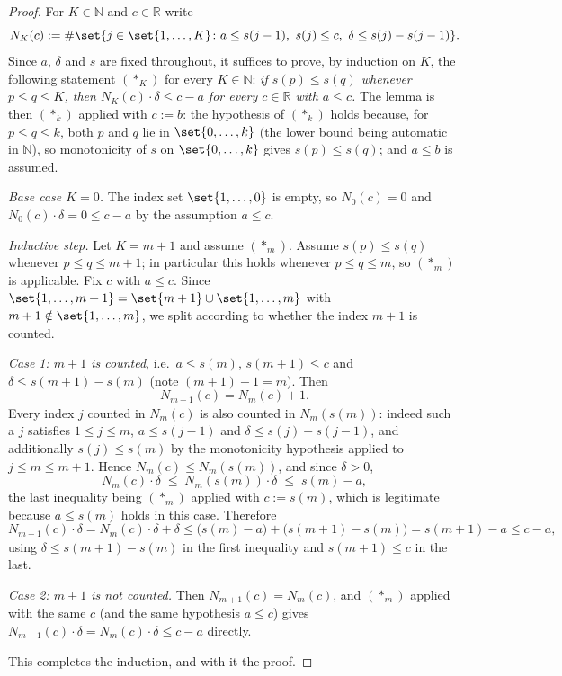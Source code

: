 \begin{proof}
  For $K \in \mathbb{N}$ and $c \in \mathbb{R}$ write
  \[
    N_K(c) := \#\set{ j \in \set{1,\dots,K} \colon a \le s(j-1),\ s(j) \le c,\
      \delta \le s(j)-s(j-1) }
    .
  \]
  Since $a$, $\delta$ and $s$ are fixed throughout, it suffices to prove, by induction on $K$, the
  following statement $(\ast_K)$ for every $K \in \mathbb{N}$: \emph{if $s(p) \le s(q)$ whenever
  $p \le q \le K$, then $N_K(c) \cdot \delta \le c - a$ for every $c \in \mathbb{R}$ with
  $a \le c$.}
  The lemma is then $(\ast_k)$ applied with $c := b$: the hypothesis of $(\ast_k)$ holds because,
  for $p \le q \le k$, both $p$ and $q$ lie in $\set{0,\dots,k}$ (the lower bound being automatic
  in $\mathbb{N}$), so monotonicity of $s$ on $\set{0,\dots,k}$ gives $s(p) \le s(q)$; and $a \le
  b$ is assumed.

  \emph{Base case $K = 0$.} The index set $\set{1,\dots,0}$ is empty, so $N_0(c) = 0$ and
  $N_0(c)\cdot\delta = 0 \le c - a$ by the assumption $a \le c$.

  \emph{Inductive step.} Let $K = m+1$ and assume $(\ast_m)$. Assume $s(p) \le s(q)$ whenever
  $p \le q \le m+1$; in particular this holds whenever $p \le q \le m$, so $(\ast_m)$ is
  applicable. Fix $c$ with $a \le c$. Since $\set{1,\dots,m+1} = \set{m+1} \cup \set{1,\dots,m}$
  with $m+1 \notin \set{1,\dots,m}$, we split according to whether the index $m+1$ is counted.

  \emph{Case 1: $m+1$ is counted}, i.e.\ $a \le s(m)$, $s(m+1) \le c$ and $\delta \le s(m+1)-s(m)$
  (note $(m+1)-1 = m$). Then
  \[
    N_{m+1}(c) = N_m(c) + 1
    .
  \]
  Every index $j$ counted in $N_m(c)$ is also counted in $N_m(s(m))$: indeed such a $j$ satisfies
  $1 \le j \le m$, $a \le s(j-1)$ and $\delta \le s(j)-s(j-1)$, and additionally $s(j) \le s(m)$
  by the monotonicity hypothesis applied to $j \le m \le m+1$. Hence $N_m(c) \le N_m(s(m))$, and
  since $\delta > 0$,
  \[
    N_m(c) \cdot \delta \;\le\; N_m(s(m)) \cdot \delta \;\le\; s(m) - a
    ,
  \]
  the last inequality being $(\ast_m)$ applied with $c := s(m)$, which is legitimate because
  $a \le s(m)$ holds in this case. Therefore
  \[
    N_{m+1}(c)\cdot\delta = N_m(c)\cdot\delta + \delta
      \le \bigl(s(m) - a\bigr) + \bigl(s(m+1) - s(m)\bigr) = s(m+1) - a \le c - a
    ,
  \]
  using $\delta \le s(m+1)-s(m)$ in the first inequality and $s(m+1) \le c$ in the last.

  \emph{Case 2: $m+1$ is not counted.} Then $N_{m+1}(c) = N_m(c)$, and $(\ast_m)$ applied with the
  same $c$ (and the same hypothesis $a \le c$) gives $N_{m+1}(c)\cdot\delta = N_m(c)\cdot\delta
  \le c - a$ directly.

  This completes the induction, and with it the proof.
\end{proof}
